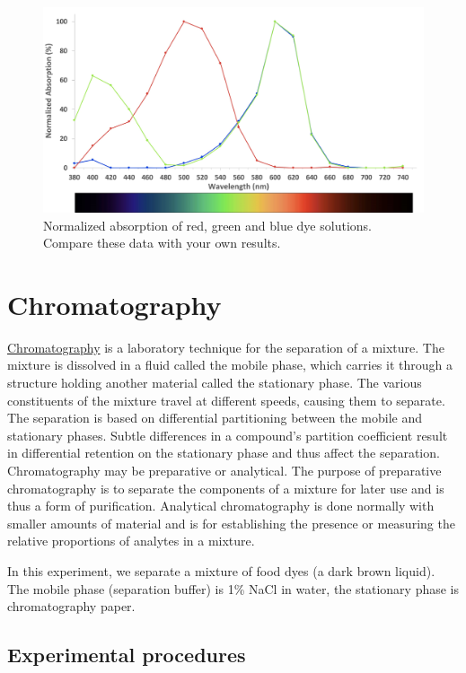 \begin{figure}

{\centering \includegraphics[width=0.7\linewidth]{./figures/photosynthesis/absorption_result}

}

\caption{Normalized absorption of red, green and blue dye solutions. Compare these data with your own results.}\label{fig:absorption}
\end{figure}

\section{Chromatography}\label{chromatography}

\href{https://en.wikipedia.org/wiki/Chromatography}{Chromatography} is a
laboratory technique for the separation of a mixture. The mixture is
dissolved in a fluid called the mobile phase, which carries it through a
structure holding another material called the stationary phase. The
various constituents of the mixture travel at different speeds, causing
them to separate. The separation is based on differential partitioning
between the mobile and stationary phases. Subtle differences in a
compound's partition coefficient result in differential retention on the
stationary phase and thus affect the separation. Chromatography may be
preparative or analytical. The purpose of preparative chromatography is
to separate the components of a mixture for later use and is thus a form
of purification. Analytical chromatography is done normally with smaller
amounts of material and is for establishing the presence or measuring
the relative proportions of analytes in a mixture.

In this experiment, we separate a mixture of food dyes (a dark brown
liquid). The mobile phase (separation buffer) is 1\% NaCl in water, the
stationary phase is chromatography paper.

\subsection{Experimental procedures}\label{experimental-procedures-27}

